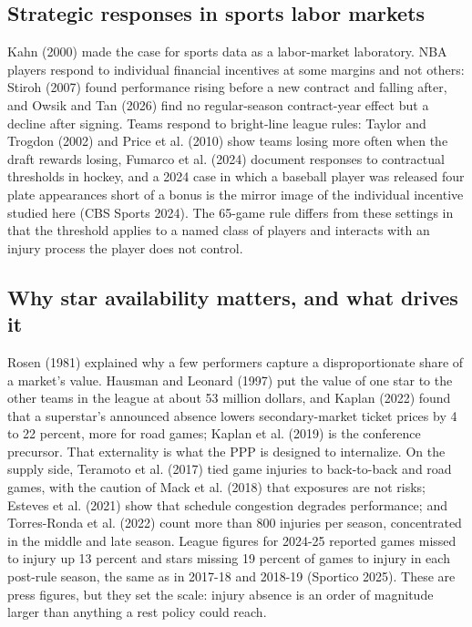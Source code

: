 \documentclass[11pt]{article}
\begin{document}
\subsection*{Strategic responses in sports labor markets}


Kahn (2000) made the case for sports data as a labor-market laboratory. NBA players respond to individual financial incentives at some margins and not others: Stiroh (2007) found performance rising before a new contract and falling after, and Owsik and Tan (2026) find no regular-season contract-year effect but a decline after signing. Teams respond to bright-line league rules: Taylor and Trogdon (2002) and Price et al. (2010) show teams losing more often when the draft rewards losing, Fumarco et al. (2024) document responses to contractual thresholds in hockey, and a 2024 case in which a baseball player was released four plate appearances short of a bonus is the mirror image of the individual incentive studied here (CBS Sports 2024). The 65-game rule differs from these settings in that the threshold applies to a named class of players and interacts with an injury process the player does not control.


\subsection*{Why star availability matters, and what drives it}


Rosen (1981) explained why a few performers capture a disproportionate share of a market's value. Hausman and Leonard (1997) put the value of one star to the other teams in the league at about 53 million dollars, and Kaplan (2022) found that a superstar's announced absence lowers secondary-market ticket prices by 4 to 22 percent, more for road games; Kaplan et al. (2019) is the conference precursor. That externality is what the PPP is designed to internalize. On the supply side, Teramoto et al. (2017) tied game injuries to back-to-back and road games, with the caution of Mack et al. (2018) that exposures are not risks; Esteves et al. (2021) show that schedule congestion degrades performance; and Torres-Ronda et al. (2022) count more than 800 injuries per season, concentrated in the middle and late season. League figures for 2024-25 reported games missed to injury up 13 percent and stars missing 19 percent of games to injury in each post-rule season, the same as in 2017-18 and 2018-19 (Sportico 2025). These are press figures, but they set the scale: injury absence is an order of magnitude larger than anything a rest policy could reach.
\end{document}
